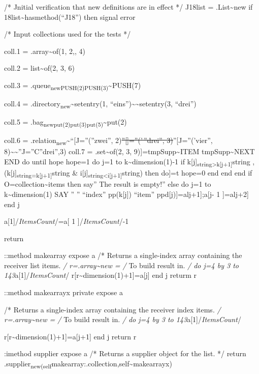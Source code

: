 /* Jnitial verification that new definitions are in effect */ J18list =
.List\textasciitilde new if \J18list\textasciitilde hasmethod(``J18'')
then signal error

/* Input collections used for the tests */

coll.1 = .array\textasciitilde of(1, 2,, 4)

coll.2 = list\textasciitilde of(2, 3, 6)

coll.3 = .queue\textsubscript{newPUSH(2)PUSH(3)}\textasciitilde PUSH(7)

coll.4 = .directory\textsubscript{new}\textasciitilde setentry(1,
``eins'')\textasciitilde\textasciitilde setentry(3, ``drei'')

coll.5 = .bag\textsubscript{newput(2)put(3)put(5)}\textasciitilde put(2)

coll.6 =
.relation\textsubscript{new}\textasciitilde{}``{[}J=''(''zwei'',
2)\sout{''{[}{]}=''('\,''drei'', 3)}''{[}J=''('vier'',
8)\textasciitilde\textasciitilde''J=''C''drei'',3) coll.7 =
.set\textasciitilde of(2, 3, 9){]}=tmpSupp\textasciitilde ITEM
tmpSupp\textasciitilde NEXT END do until hope hope=1 do j=1 to
k\textasciitilde dimension(1)-1 if
k{[}j{]}\textsubscript{string\textgreater k{[}j+1{]}}string \textbar,
(k{[}j{]}\textsubscript{string=k{[}j+1{]}}string \&
i{[}j{]}\textsubscript{string\textless i{[}j+1{]}}string) then do{]}=t
hope=0 end end end if O=collection\textasciitilde items then say'' The
result is empty!'' else do j=1 to k\textasciitilde dimension(1) SAY ''
'' ``index'' pp(k{[}j{]}) ``item'' ppd{[}j){]}=alj+1{]};a{[}j- 1
{]}=alj+2{]} end j

a{[}1{]}/\emph{ItemsCount}/=a{[} 1 {]}/\emph{ItemsCount}/-1

return

::method makearray expose a /* Returns a single-index array containing
the receiver list items. \emph{/ r=.array\textasciitilde new = /} To
build result in. \emph{/ do j=4 by 3 to 143}a{[}1{]}/\emph{ItemsCount}/
r{[}r\textasciitilde dimension(1)+1{]}=a{[}j{]} end j returm r

::method makearrayx private expose a

/* Returns a single-index array containing the receiver index items.
\emph{/ r=.array\textasciitilde new = /} To build result in. \emph{/ do
j=4 by 3 to 143}a{[}1{]}/\emph{ItemsCount}/

r{[}r\textasciitilde dimension(1)+1{]}=a{[}j+1{]} end j return r

:imethod supplier expose a /* Returns a supplier object for the list. */
return
.supplier\textsubscript{new(self}makearray:.collection,self\textasciitilde makearrayx)


